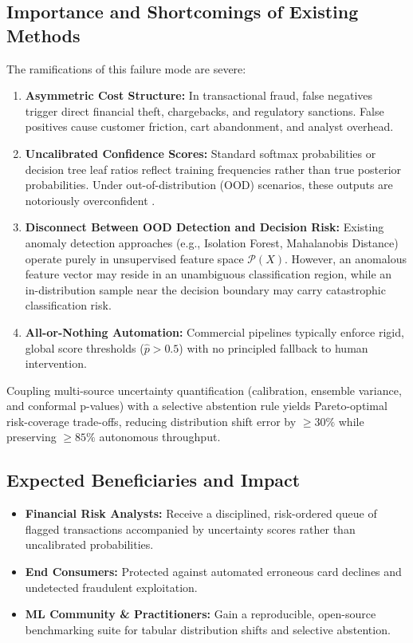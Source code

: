 \documentclass[10pt,a4paper,twocolumn]{article}
\begin{document}
\subsection{Importance and Shortcomings of Existing Methods}
The ramifications of this failure mode are severe:
\begin{enumerate}
  \item \textbf{Asymmetric Cost Structure:} In transactional fraud, false negatives trigger direct financial theft, chargebacks, and regulatory sanctions. False positives cause customer friction, cart abandonment, and analyst overhead.
  \item \textbf{Uncalibrated Confidence Scores:} Standard softmax probabilities or decision tree leaf ratios reflect training frequencies rather than true posterior probabilities. Under out-of-distribution (OOD) scenarios, these outputs are notoriously overconfident \cite{guo2017calibration}.
  \item \textbf{Disconnect Between OOD Detection and Decision Risk:} Existing anomaly detection approaches (e.g., Isolation Forest, Mahalanobis Distance) operate purely in unsupervised feature space $\mathcal{P}(X)$. However, an anomalous feature vector may reside in an unambiguous classification region, while an in-distribution sample near the decision boundary may carry catastrophic classification risk.
  \item \textbf{All-or-Nothing Automation:} Commercial pipelines typically enforce rigid, global score thresholds ($\hat{p} > 0.5$) with no principled fallback to human intervention.
\end{enumerate}

\begin{calloutbox}[title={Core Research Hypothesis}]
Coupling multi-source uncertainty quantification (calibration, ensemble variance, and conformal p-values) with a selective abstention rule yields Pareto-optimal risk-coverage trade-offs, reducing distribution shift error by $\ge 30\%$ while preserving $\ge 85\%$ autonomous throughput.
\end{calloutbox}

\subsection{Expected Beneficiaries and Impact}
\begin{itemize}
  \item \textbf{Financial Risk Analysts:} Receive a disciplined, risk-ordered queue of flagged transactions accompanied by uncertainty scores rather than uncalibrated probabilities.
  \item \textbf{End Consumers:} Protected against automated erroneous card declines and undetected fraudulent exploitation.
  \item \textbf{ML Community \& Practitioners:} Gain a reproducible, open-source benchmarking suite for tabular distribution shifts and selective abstention.
\end{itemize}
\end{document}
